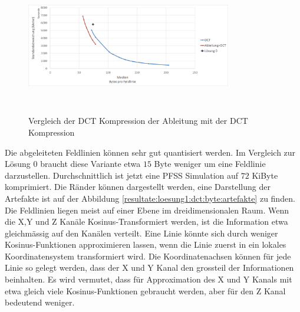 \begin{figure}[!htbp]
	\center
	\includegraphics[width=0.8\textwidth,height=6cm,keepaspectratio]{./pictures/resultate/loesung1/loesung1-1/loesung1_1.png}
	\caption{Vergleich der DCT Kompression der Ableitung mit der DCT Kompression}
	\label{resultate:loesung1:dct:artefakte}
\end{figure}
Die abgeleiteten Feldlinien können sehr gut quantisiert werden. Im Vergleich zur Lösung 0 braucht diese Variante etwa $15$ Byte weniger um eine Feldlinie darzustellen. Durchschnittlich ist jetzt eine PFSS Simulation auf $72$ KiByte komprimiert. Die Ränder können dargestellt werden, eine Darstellung der Artefakte ist auf der Abbildung \ref{resultate:loesung1:dct:byte:artefakte} zu finden.\\
Die Feldlinien liegen meist auf einer Ebene im dreidimensionalen Raum. Wenn die X,Y und Z Kanäle Kosinus-Transformiert werden, ist die Information etwa gleichmässig auf den Kanälen verteilt. Eine Linie könnte sich durch weniger Kosinus-Funktionen approximieren lassen, wenn die Linie zuerst in ein lokales Koordinatensystem transformiert wird. Die Koordinatenachsen können für jede Linie so gelegt werden, dass der X und Y Kanal den grossteil der Informationen beinhalten. Es wird vermutet, dass für Approximation des X und Y Kanals mit etwa gleich viele Kosinus-Funktionen gebraucht werden, aber für den Z Kanal bedeutend weniger.

